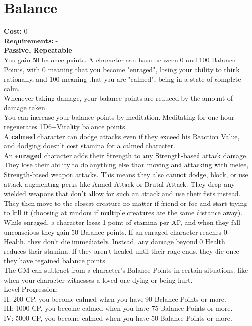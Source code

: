 \section{Balance}
\textbf{Cost:} 0\\
\textbf{Requirements:} -\\
\textbf{Passive, Repeatable}\\
You gain 50 balance points. A character can have between 0 and 100 Balance Points, with 0 meaning that you become "enraged", losing your ability to think rationally, and 100 meaning that you are "calmed", being in a state of complete calm.\\
Whenever taking damage, your balance points are reduced by the amount of damage taken.\\
You can increase your balance points by meditation. Meditating for one hour regenerates 1D6+Vitality balance points.\\
A \textbf{calmed} character can dodge attacks even if they exceed his Reaction Value, and dodging doesn't cost stamina for a calmed character.\\
An \textbf{enraged} character adds their Strength to any Strength-based attack damage. They lose their ability to do anything else than moving and attacking with melee, Strength-based weapon attacks. This means they also cannot dodge, block, or use attack-augmenting perks like Aimed Attack or Brutal Attack. They drop any wielded weapons that don't allow for such an attack and use their fists instead. They then move to the closest creature no matter if friend or foe and start trying to kill it (choosing at random if multiple creatures are the same distance away). While enraged, a character loses 1 point of stamina per AP, and when they fall unconscious they gain 50 Balance points. If an enraged character reaches 0 Health, they don't die immediately. Instead, any damage beyond 0 Health reduces their stamina. If they aren't healed until their rage ends, they die once they have regained balance points.\\
The GM can subtract from a character's Balance Points in certain situations, like when your character witnesses a loved one dying or being hurt.
\\
Level Progression:\\
II: 200 CP, you become calmed when you have 90 Balance Points or more.\\
III: 1000 CP, you become calmed when you have 75 Balance Points or more.\\
IV: 5000 CP, you become calmed when you have 50 Balance Points or more.\\